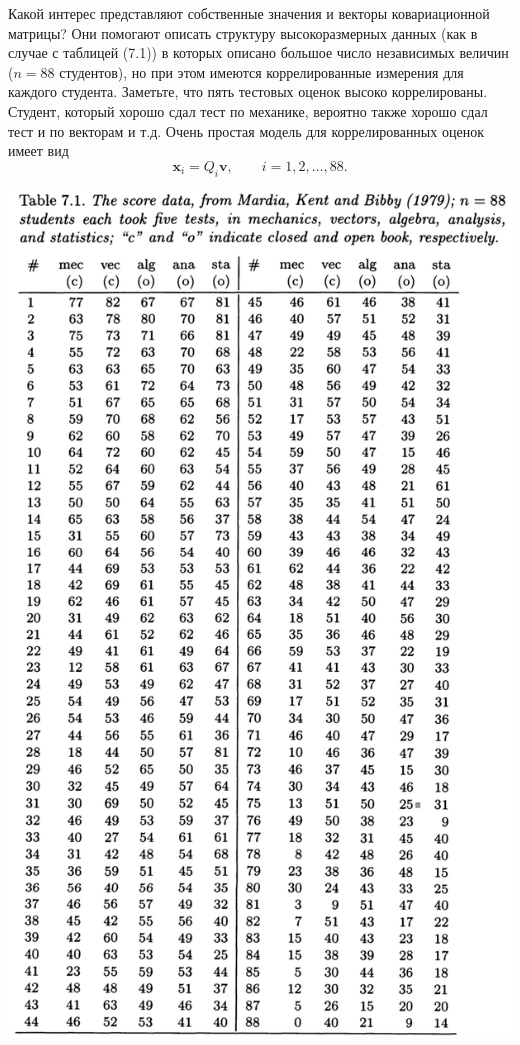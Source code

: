\setcounter{equation}{6}
Какой интерес представляют собственные значения и векторы ковариационной матрицы? Они помогают описать структуру высокоразмерных данных (как в случае с таблицей (7.1)) в которых описано большое число независимых величин ($n = 88$ студентов), но при этом имеются коррелированные измерения для каждого студента. Заметьте, что пять тестовых оценок высоко коррелированы. Студент, который хорошо сдал тест по механике, вероятно также хорошо сдал тест и по векторам и т.д. Очень простая модель для коррелированных оценок имеет вид
\begin{equation}
	\mathbf x_i = Q_i \mathbf v, \qquad i = 1,2,\ldots,88.
\end{equation}

\noindent
\includegraphics[width=0.9\linewidth]{6/t71.png}
\newline
\setcounter{table}{1}

